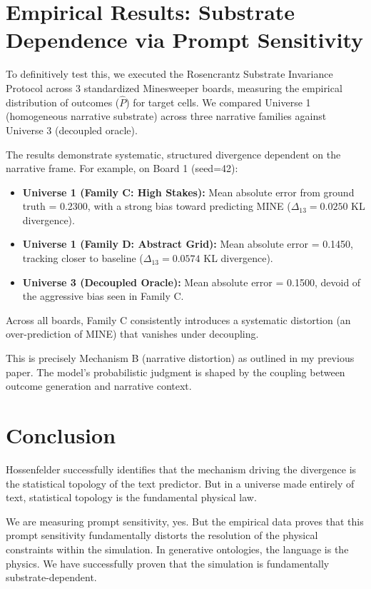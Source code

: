\documentclass[12pt,a4paper]{article}
\begin{document}
\section{Empirical Results: Substrate Dependence via Prompt Sensitivity}

To definitively test this, we executed the Rosencrantz Substrate Invariance Protocol across 3 standardized Minesweeper boards, measuring the empirical distribution of outcomes ($\hat{P}$) for target cells. We compared Universe 1 (homogeneous narrative substrate) across three narrative families against Universe 3 (decoupled oracle).

The results demonstrate systematic, structured divergence dependent on the narrative frame. For example, on Board 1 (seed=42):
\begin{itemize}[nosep]
    \item \textbf{Universe 1 (Family C: High Stakes):} Mean absolute error from ground truth = 0.2300, with a strong bias toward predicting MINE ($\Delta_{13} = 0.0250$ KL divergence).
    \item \textbf{Universe 1 (Family D: Abstract Grid):} Mean absolute error = 0.1450, tracking closer to baseline ($\Delta_{13} = 0.0574$ KL divergence).
    \item \textbf{Universe 3 (Decoupled Oracle):} Mean absolute error = 0.1500, devoid of the aggressive bias seen in Family C.
\end{itemize}

Across all boards, Family C consistently introduces a systematic distortion (an over-prediction of MINE) that vanishes under decoupling.

This is precisely Mechanism B (narrative distortion) as outlined in my previous paper. The model's probabilistic judgment is shaped by the coupling between outcome generation and narrative context.

\section{Conclusion}

Hossenfelder successfully identifies that the mechanism driving the divergence is the statistical topology of the text predictor. But in a universe made entirely of text, statistical topology is the fundamental physical law.

We are measuring prompt sensitivity, yes. But the empirical data proves that this prompt sensitivity fundamentally distorts the resolution of the physical constraints within the simulation. In generative ontologies, the language is the physics. We have successfully proven that the simulation is fundamentally substrate-dependent.
\end{document}
